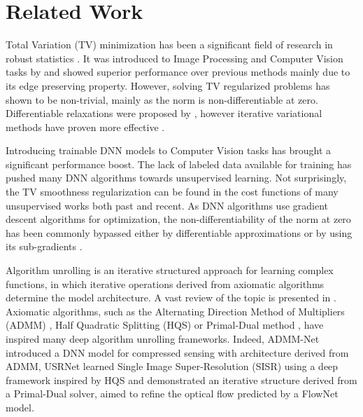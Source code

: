 \documentclass[10pt,twocolumn,letterpaper]{article}
\begin{document}
 \section{Related Work}

Total Variation (TV) minimization has been a significant field of research in robust statistics \cite{Huber.Wiley.ea1981Robuststatistics}. It was introduced to Image Processing and Computer Vision tasks by \cite{RUDIN1992259} and showed superior performance over previous methods mainly due to its edge preserving property. However, solving TV regularized problems has shown to be non-trivial, mainly as the  norm is non-differentiable at zero. Differentiable relaxations were proposed by \cite{huber1964robust,charbonnier1997deterministic,Chambolle1997ImageRV}, however iterative variational methods have proven more effective \cite{doi:10.1080/00207160500069904,zach2007duality,admm0}.

Introducing trainable DNN models to Computer Vision tasks has brought a significant performance boost. The lack of labeled data available for training has pushed many DNN algorithms towards unsupervised learning. Not surprisingly, the TV smoothness regularization can be found in the cost functions of many unsupervised works both past and recent. As DNN algorithms use gradient descent algorithms for optimization, the non-differentiability of the  norm at zero has been commonly bypassed either by differentiable approximations \cite{meister2017unflow} or by using its sub-gradients \nolinebreak \cite{kim2020unsupervised,jonschkowski2020matters,luo2021upflow}.

Algorithm unrolling is an iterative structured approach for learning complex functions, in which iterative operations derived from axiomatic algorithms determine the model architecture. A vast review of the topic is presented in \cite{monga2019algorithm}. Axiomatic algorithms, such as the Alternating Direction Method of Multipliers (ADMM) \cite{admm0}, Half Quadratic Splitting (HQS) \cite{5445028} or Primal-Dual method \cite{chambolle2011first}, have inspired many deep algorithm unrolling frameworks. Indeed, ADMM-Net \cite{sun2016deep} introduced a DNN model for compressed sensing with architecture derived from ADMM, USRNet \cite{zhang2020deep} learned Single Image Super-Resolution (SISR) using a deep framework inspired by HQS and \cite{wang2016proximal} demonstrated an iterative structure derived from a Primal-Dual solver, aimed to refine the optical flow predicted by a FlowNet \cite{dosovitskiy2015flownet} model. 
\end{document}
